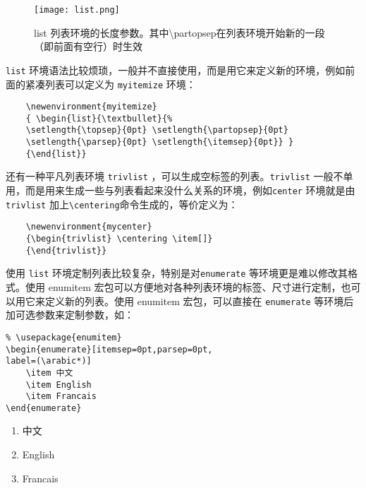 \begin{figure}[H]
    \centering
    \texttt{[image: list.png]}
    \caption{{\ttfamily list} 列表环境的长度参数。其中{\ttfamily \textbackslash partopsep}在列表环境开始新的一段（即前面有空行）时生效}
    \label{fig:list}
\end{figure}

\verb|list| 环境语法比较烦琐，一般并不直接使用，而是用它来定义新的环境，例如前面的紧凑列表可以定义为 \verb|myitemize| 环境：

\begin{lstlisting}
    \newenvironment{myitemize}
    { \begin{list}{\textbullet}{%
    \setlength{\topsep}{0pt} \setlength{\partopsep}{0pt}
    \setlength{\parsep}{0pt} \setlength{\itemsep}{0pt}} }
    {\end{list}}
\end{lstlisting}

还有一种平凡列表环境 \verb|trivlist| ，可以生成空标签的列表。\verb|trivlist| 一般不单用，而是用来生成一些与列表看起来没什么关系的环境，例如\verb|center| 环境就是由 \verb|trivlist| 加上\verb|\centering|命令生成的，等价定义为：

\begin{lstlisting}
    \newenvironment{mycenter}
    {\begin{trivlist} \centering \item[]}
    {\end{trivlist}}
\end{lstlisting}

使用 \verb|list| 环境定制列表比较复杂，特别是对\verb|enumerate| 等环境更是难以修改其格
式。使用 enumitem 宏包可以方便地对各种列表环境的标签、尺寸进行定制，也可以用它来定义新的列表。使用 enumitem 宏包，可以直接在 \verb|enumerate| 等环境后加可选参数来定制参数，如：

\begin{minipage}[t]{0.45\textwidth}
\begin{lstlisting}
% \usepackage{enumitem}
\begin{enumerate}[itemsep=0pt,parsep=0pt,
label=(\arabic*)]
    \item 中文
    \item English
    \item Francais
\end{enumerate}
\end{lstlisting}
\end{minipage}
\hfill
\begin{minipage}[t]{0.45\textwidth}
    \begin{enumerate}[itemsep=0pt,parsep=0pt,
        label=(\arabic*)]
            \item 中文
            \item English
            \item Francais
    \end{enumerate}
\end{minipage}

